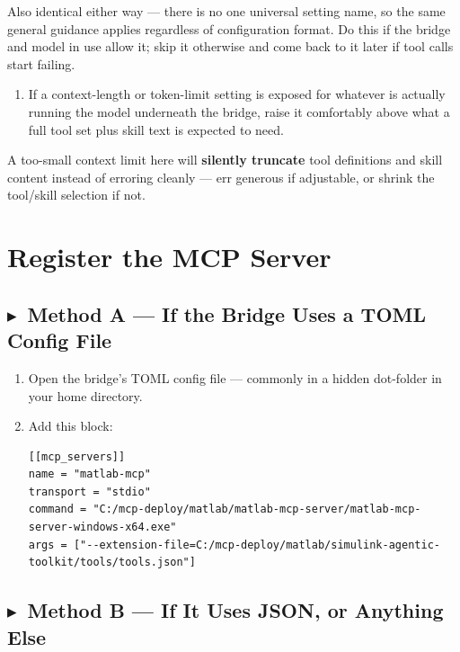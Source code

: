\documentclass[11pt, letterpaper]{article}
\newcommand{\methodA}{\subsection*{\color{TSblue}$\blacktriangleright$~Method A --- If the Bridge Uses a TOML Config File}}
\newcommand{\methodB}{\subsection*{\color{TSmaroon}$\blacktriangleright$~Method B --- If It Uses JSON, or Anything Else}}
\begin{document}
Also identical either way --- there is no one universal setting name, so the same general
guidance applies regardless of configuration format. Do this if the bridge and model in use
allow it; skip it otherwise and come back to it later if tool calls start failing.

\begin{enumerate}
  \item If a context-length or token-limit setting is exposed for whatever is actually running
        the model underneath the bridge, raise it comfortably above what a full tool set plus
        skill text is expected to need.
\end{enumerate}

\begin{notebox}
  A too-small context limit here will \textbf{silently truncate} tool definitions and skill
  content instead of erroring cleanly --- err generous if adjustable, or shrink the tool/skill
  selection if not.
\end{notebox}


\section{Register the MCP Server}

\methodA

\begin{enumerate}
  \item Open the bridge's TOML config file --- commonly  in a hidden
        dot-folder in your home directory.

  \item Add this block:

  \begin{codeblock}
  \begin{Verbatim}
[[mcp_servers]]
name = "matlab-mcp"
transport = "stdio"
command = "C:/mcp-deploy/matlab/matlab-mcp-server/matlab-mcp-server-windows-x64.exe"
args = ["--extension-file=C:/mcp-deploy/matlab/simulink-agentic-toolkit/tools/tools.json"]
  \end{Verbatim}
  \end{codeblock}
\end{enumerate}

\methodB
\end{document}

